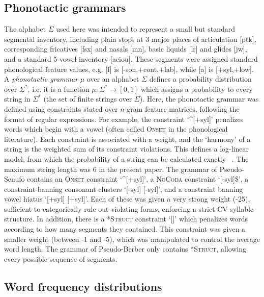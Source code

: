 \documentclass[11pt]{article}
\begin{document}
\subsection{Phonotactic grammars}

The alphabet $\Sigma$ used here was intended to represent a small but standard segmental inventory, including plain stops at 3 major places of articulation [ptk], corresponding fricatives [fsx] and nasals [mn\engma], basic liquids [lr] and glides [jw], and a standard 5-vowel inventory [aeiou]. These segments were assigned standard phonological feature values, e.g. [f] is [-son,+cont,+lab], while [a] is [+syl,+low]. %
A \textit{phonotactic grammar} $\mu$ over an alphabet $\Sigma$ defines a probability distribution over $\Sigma^*$, i.e. it is a function $\mu : \Sigma^* \rightarrow [0,1]$ which assigns a probability to every string in $\Sigma^*$ (the set of finite strings over $\Sigma$). Here, the phonotactic grammar was defined using constraints stated over $n$-gram feature matrices, following the format of regular expressions. For example, the constraint `\textasciicircum[+syl]' penalizes words which begin with a vowel (often called \textsc{Onset} in the phonological literature). Each constraint is associated with a weight, and the `harmony' of a string is the weighted sum of its constraint violations. This defines a log-linear model, from which the probability of a string can be calculated exactly ~\cite{Hayes08a}. The maximum string length was 6 in the present paper. The grammar of Pseudo-Senufo contains an \textsc{Onset} constraint `\textasciicircum[+syl]', a \textsc{NoCoda} constraint `[-syl]\$', a constraint banning consonant clusters `[-syl] [-syl]', and a constraint banning vowel hiatus `[+syl] [+syl]'. Each of these was given a very strong weight (-25), sufficient to categorically rule out violating forms, enforcing a strict CV syllable structure. In addition, there is a \textsc{*Struct} constraint `[]' which penalizes words according to how many segments they contained. This constraint was given a smaller weight (between -1 and -5), which was manipulated to control the average word length. The grammar of Pseudo-Berber only contains \textsc{*Struct}, allowing every possible sequence of segments. 

\subsection{Word frequency distributions}
\end{document}
